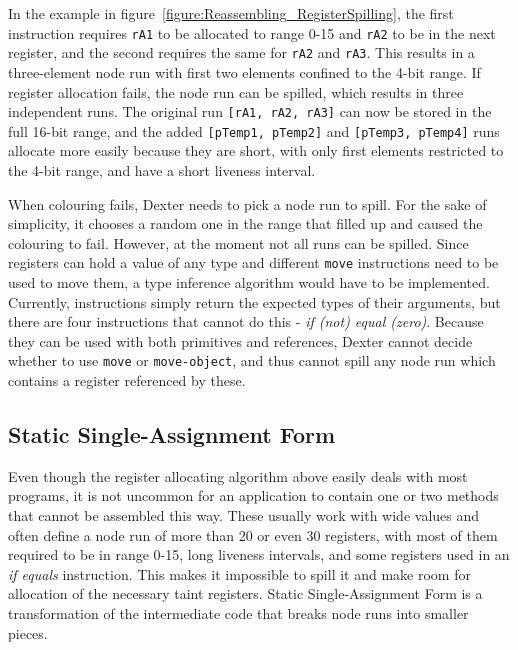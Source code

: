 \documentclass[12pt,twoside,notitlepage]{report}
\begin{document}
In the example in figure~\ref{figure:Reassembling_RegisterSpilling}, the first instruction requires \verb$rA1$ to be allocated to range 0-15 and \verb$rA2$ to be in the next register, and the second requires the same for \verb$rA2$ and \verb$rA3$. This results in a three-element node run with first two elements confined to the 4-bit range. If register allocation fails, the node run can be spilled, which results in three independent runs. The original run \verb$[rA1, rA2, rA3]$ can now be stored in the full 16-bit range, and the added \verb$[pTemp1, pTemp2]$ and \verb$[pTemp3, pTemp4]$ runs allocate more easily because they are short, with only first elements restricted to the 4-bit range, and have a short liveness interval.

When colouring fails, Dexter needs to pick a node run to spill. For the sake of simplicity, it chooses a random one in the range that filled up and caused the colouring to fail. However, at the moment not all runs can be spilled. Since registers can hold a value of any type and different \verb$move$ instructions need to be used to move them, a type inference algorithm would have to be implemented. Currently, instructions simply return the expected types of their arguments, but there are four instructions that cannot do this - \emph{if (not) equal (zero)}. Because they can be used with both primitives and references, Dexter cannot decide whether to use \verb$move$ or \verb$move-object$, and thus cannot spill any node run which contains a register referenced by these.

\subsection{Static Single-Assignment Form}

Even though the register allocating algorithm above easily deals with most programs, it is not uncommon for an application to contain one or two methods that cannot be assembled this way. These usually work with wide values and often define a node run of more than 20 or even 30 registers, with most of them required to be in range 0-15, long liveness intervals, and some registers used in an \emph{if equals} instruction. This makes it impossible to spill it and make room for allocation of the necessary taint registers. Static Single-Assignment Form is a transformation of the intermediate code that breaks node runs into smaller pieces. 
\end{document}
